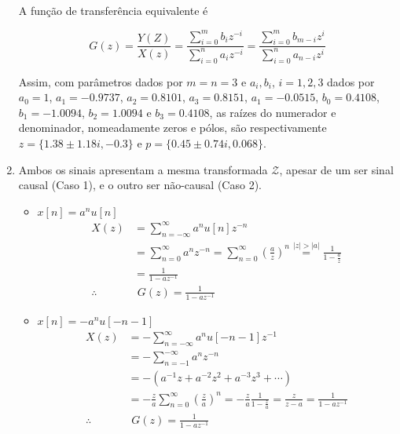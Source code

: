 \documentclass[twoside, fleqn]{article}
\begin{document}
\begin{enumerate}
        A função de transferência equivalente é
        
            \begin{equation}
                G(z) = \frac{Y(Z)}{X(z)} = \frac{\sum_{i=0}^{m} b_{i} z^{-i}}{\sum_{i=0}^{n} a_{i} z^{-i}} = \frac{\sum_{i=0}^{m} b_{m-i} z^{i}}{\sum_{i=0}^{n} a_{n-i} z^{i}}
            \end{equation}
        
        Assim, com parâmetros dados por $m = n = 3$ e $a_i, b_i$, $i = 1, 2, 3$ dados por $a_0 = 1$, $a_1 = -0.9737$, $a_2 = 0.8101$, $a_3 = 0.8151$, $a_1 = -0.0515$, $b_0 = 0.4108$, $b_1 = -1.0094$, $b_2 = 1.0094$ e $b_3 = 0.4108$, as raízes do numerador e denominador, nomeadamente zeros e pólos, são respectivamente $z = \{1.38 \pm 1.18 i, -0.3\}$ e $p = \{0.45 \pm 0.74i, 0.068\}$.
        
        \item %
        
        Ambos os sinais apresentam a mesma transformada $\mathcal{Z}$, apesar de um ser sinal causal (Caso 1), e o outro ser não-causal (Caso 2).
        
            \begin{itemize}
                \item $x[n] = a^n u[n]$
                    \begin{equation}
                        \begin{split}
                            X(z) &= \sum_{n = -\infty}^{\infty} a^n u[n] z^{-n} \\
                            & = \sum_{n 
                            = 0}^{\infty} a^n z^{-n} = \sum_{n = 0}^{\infty} (\frac{a}{z})^n \stackrel{|z| > |a|}{=} \frac{1}{1 - \frac{a}{z}} \\
                            &= \frac{1}{1 - a z^{-1}} \\
                            \therefore & \,\, G(z) = \frac{1}{1 - a z^{-1}}
                        \end{split}
                    \end{equation}
                
                \item $x[n] = -a^n u[-n-1]$
                    \begin{equation}
                        \begin{split}
                            X(z) &= - \sum_{n = - \infty}^{\infty} a^n u[-n - 1] z^{-1} \\
                            &= - \sum_{n = -1}^{-\infty} a^n z^{-n} \\
                            &= -\left(a^{-1}z + a^{-2} z^2 + a^{-3} z^3 + \cdots\right) \\
                            &= -\frac{z}{a} \sum_{n = 0}^{\infty} (\frac{z}{a})^n = - \frac{z}{a} \frac{1}{1 - \frac{z}{a}} = \frac{z}{z-a} = \frac{1}{1 - a z^{-1}} \\
                            \therefore & \,\, G(z) = \frac{1}{1 - a z^{-1}}
                        \end{split}
                    \end{equation}
                    

\end{itemize}
\end{enumerate}
\end{document}
